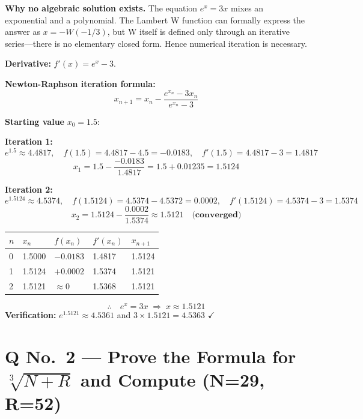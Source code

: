 \documentclass[12pt]{article}
\newcommand{\hcell}[1]{\textbf{\color{white}#1}}
\begin{document}
\textbf{Why no algebraic solution exists.} The equation $e^x = 3x$ mixes an exponential and a polynomial. The Lambert W function can formally express the answer as $x = -W(-1/3)$, but W itself is defined only through an iterative series---there is no elementary closed form. Hence numerical iteration is necessary.

\medskip
\textbf{Derivative:} $f'(x) = e^x - 3$.

\medskip
\textbf{Newton-Raphson iteration formula:}
\[
  x_{n+1} = x_n - \frac{e^{x_n} - 3x_n}{e^{x_n} - 3}
\]

\textbf{Starting value} $x_0 = 1.5$:

\medskip
\noindent\textbf{Iteration 1:}
\[
  e^{1.5} \approx 4.4817, \quad f(1.5) = 4.4817 - 4.5 = -0.0183, \quad f'(1.5) = 4.4817 - 3 = 1.4817
\]
\[
  x_1 = 1.5 - \frac{-0.0183}{1.4817} = 1.5 + 0.01235 = \mathbf{1.5124}
\]

\noindent\textbf{Iteration 2:}
\[
  e^{1.5124} \approx 4.5374, \quad f(1.5124) = 4.5374 - 4.5372 = 0.0002, \quad f'(1.5124) = 4.5374 - 3 = 1.5374
\]
\[
  x_2 = 1.5124 - \frac{0.0002}{1.5374} \approx \mathbf{1.5121} \quad \textbf{(converged)}
\]

\begin{center}
\begin{tabular}{C{0.8cm} C{2.5cm} C{3cm} C{3cm} C{2.5cm}}
\toprule
{}
\hcell{$n$} & \hcell{$x_n$} & \hcell{$f(x_n)$} & \hcell{$f'(x_n)$} & \hcell{$x_{n+1}$} \\
\midrule
{}
0 & 1.5000 & $-0.0183$ & 1.4817 & 1.5124 \\
1 & 1.5124 & $+0.0002$ & 1.5374 & 1.5121 \\
2 & 1.5121 & $\approx 0$ & 1.5368 & 1.5121 \\
\bottomrule
\end{tabular}
\end{center}

\begin{formulabox}
\[
  \therefore\quad e^x = 3x \;\Rightarrow\; x \approx \mathbf{1.5121}
\]
\textbf{Verification:} $e^{1.5121} \approx 4.5361$ and $3 \times 1.5121 = 4.5363$ \quad $\checkmark$
\end{formulabox}

\newpage

\section{Q No.\ 2 --- Prove the Formula for $\sqrt[3]{N+R}$ and Compute (N=29, R=52)}
\end{document}
